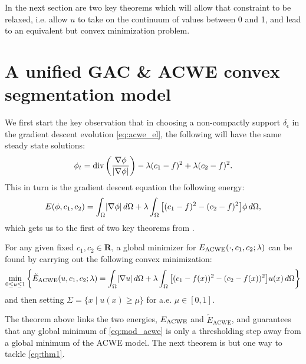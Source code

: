 In the next section are two key theorems which will allow that constraint to be relaxed, i.e. allow $u$ to take on the continuum of values between 0 and 1, and lead to an equivalent but convex minimization problem.

\section{A unified GAC \& ACWE convex segmentation model}
We first start the key observation that in choosing a non-compactly support $\delta_\epsilon$ in the gradient descent evolution \eqref{eq:acwe_el}, the following will have the same steady state solutions: 
\begin{align*}
\phi_t = \operatorname{div}\left(\frac{\nabla \phi}{\lvert\nabla \phi\rvert} \right) 
- \lambda (c_1 - f)^2 + \lambda (c_2 - f)^2 .
\end{align*}
This in turn is the gradient descent equation the following energy:
\begin{align}
E(\phi, c_1, c_2) 
= \int_\Omega \lvert\nabla \phi\rvert \,d\Omega 
+ \lambda \int_\Omega \big[ (c_1 - f)^2 - (c_2 - f)^2 \big] \phi \,d\Omega ,
\label{eq:mod_acwe}
\end{align}
which gets us to the first of two key theorems from \cite{chan2006algorithms}.

\begin{thm}
	For any given fixed $c_1, c_2 \in \mathbf{R}$, a global minimizer for $E_\textrm{ACWE}(\cdot, c_1, c_2; \lambda)$ can be found by carrying out the following convex minimization: 
	\begin{align}
	\min_{0\leq u \leq 1}\left\{
		\tilde E_{\textrm{ACWE}} (u, c_1, c_2; \lambda)
		=
		\int_{\Omega} \lvert\nabla u\rvert \,d\Omega 
	+ \lambda\int_{\Omega} \big[ (c_1 - f(x) )^2 - (c_2 - f(x))^2 \big] u(x) \,d\Omega
	\right\}
	\label{eq:thm1}
	\end{align}
	and then setting $\Sigma = \{ x \mid u(x) \geq \mu \}$ for a.e. $\mu \in [0, 1]$.
	\label{thm:1}
\end{thm}
The theorem above links the two energies, $E_\textrm{ACWE}$ and $\tilde E_\textrm{ACWE}$,
and guarantees that any global minimum of \eqref{eq:mod_acwe} is only a thresholding step away from a global minimum of the ACWE model. The next theorem is but one way to tackle \eqref{eq:thm1}.

